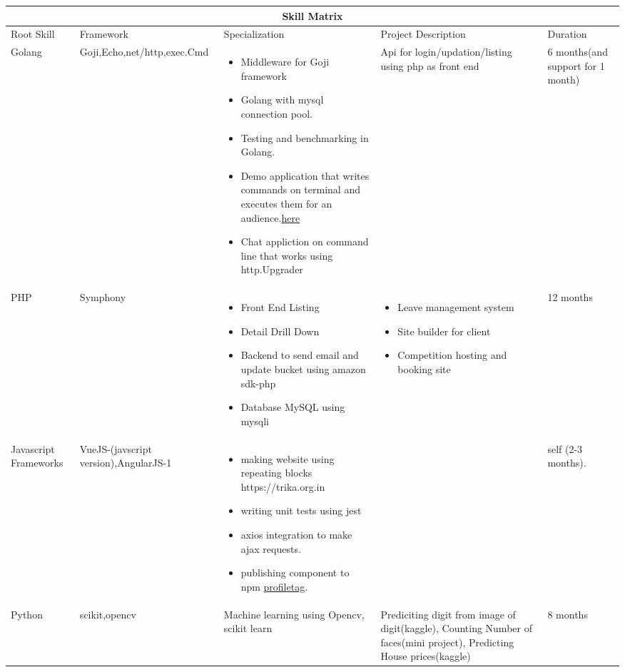 \begingroup
\fontsize{8pt}{9pt}\selectfont
\begin{center}
\begin{tabular}{|p{1.5cm}|p{2cm}|p{7cm}|p{7cm}|p{2cm}| }
 \hline
 \multicolumn{5}{|c|}{Skill Matrix} \\

 \hline
Root Skill &Framework &Specialization &Project Description &Duration\\
\hline
Golang
    & Goji,Echo,net/http,exec.Cmd
    & \begin{itemize} 
	\item Middleware  for Goji framework  
	\item Golang with mysql connection pool.
	\item Testing and benchmarking in Golang. 
	\item Demo application that writes commands on terminal and
	    executes them for an
	    audience.\href{https://github.com/kurianCoding/comma}{here}
	\item Chat appliction on command line that works using
	    http.Upgrader
	\end{itemize}
    & Api for login/updation/listing using php as front end  
    & 6 months(and support for 1 month)\\
\hline
PHP
    & Symphony
& \begin{itemize} 
    \item Front End Listing 
    \item Detail Drill Down 
    \item Backend to send email and update bucket using amazon sdk-php 
    \item Database MySQL using mysqli 
\end{itemize}
    &\begin{itemize} 
	    \item Leave management system 
	    \item Site builder for client 
	    \item Competition hosting and booking site
	\end{itemize}
    & 12  months \\

\hline
    Javascript Frameworks
    & VueJS-(javscript version),AngularJS-1
    & \begin{itemize} 
    \item making website using repeating blocks https://trika.org.in
    \item writing unit tests using jest
    \item axios integration to make ajax requests.
    \item publishing component to npm
	\href{https://www.npmjs.com/package/@kurian2020/profiletag}{profiletag}.
    \end{itemize} 
    & 
    & self (2-3 months). \\
    \hline
Python 
& scikit,opencv 
& Machine learning using Opencv, scikit learn 
    & Prediciting digit from image of digit(kaggle), Counting Number of
    faces(mini project), Predicting House prices(kaggle) 
& 8 months \\
\hline
\end{tabular}
\end{center}


